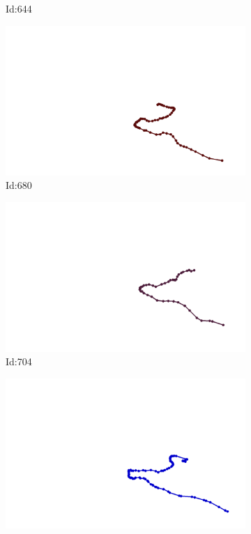 \documentclass[12pt,twoside]{report}
\begin{document}
\begin{figure}
\begin{subfigure}[b]{0.20\textwidth}
\caption{Id:644}
\end{subfigure}
\begin{subfigure}[b]{0.20\textwidth}
\centering
\includegraphics[width=\textwidth]{../../trajectories/680.png}
\caption{Id:680}
\end{subfigure}
\begin{subfigure}[b]{0.20\textwidth}
\centering
\includegraphics[width=\textwidth]{../../trajectories/704.png}
\caption{Id:704}
\end{subfigure}
\begin{subfigure}[b]{0.20\textwidth}
\centering
\includegraphics[width=\textwidth]{../../trajectories/784.png}

\end{subfigure}
\end{figure}
\end{document}
